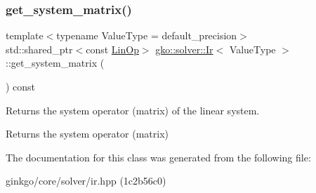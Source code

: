 \subsubsection{\texorpdfstring{get\+\_\+system\+\_\+matrix()}{get\_system\_matrix()}}
{\footnotesize\ttfamily template$<$typename Value\+Type  = default\+\_\+precision$>$ \\
std\+::shared\+\_\+ptr$<$const \hyperlink{classgko_1_1LinOp}{Lin\+Op}$>$ \hyperlink{classgko_1_1solver_1_1Ir}{gko\+::solver\+::\+Ir}$<$ Value\+Type $>$\+::get\+\_\+system\+\_\+matrix (\begin{DoxyParamCaption}{ }\end{DoxyParamCaption}) const}



Returns the system operator (matrix) of the linear system. 

\begin{DoxyReturn}{Returns}
the system operator (matrix) 
\end{DoxyReturn}


The documentation for this class was generated from the following file\+:\begin{DoxyCompactItemize}
\item 
ginkgo/core/solver/ir.\+hpp (1c2b56c0)\end{DoxyCompactItemize}

